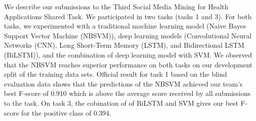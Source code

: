 We describe our submissions to the Third Social Media Mining for Health Applications Shared Task. We participated in two tasks (tasks 1 and 3). For both tasks, we experimented with a traditional machine learning model (Naive Bayes Support Vector Machine (NBSVM)), deep learning models (Convolutional Neural Networks (CNN), Long Short-Term Memory (LSTM), and Bidirectional LSTM (BiLSTM)), and the combination of deep learning model with SVM. We observed that the NBSVM reaches superior performance on both tasks on our development split of the training data sets. Official result for task 1 based on the blind evaluation data shows that the predictions of the NBSVM achieved our team's best F-score of 0.910 which is above the average score received by all submissions to the task. On task 3, the cobination of of BiLSTM and SVM gives our best F-score for the positive class of 0.394.
